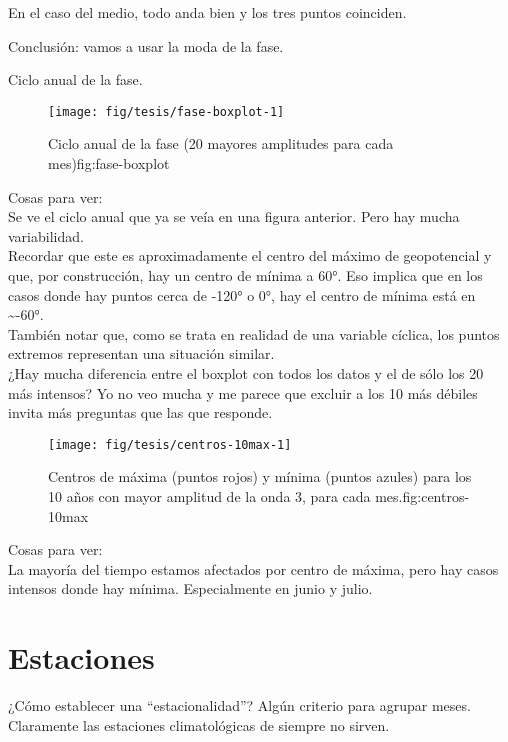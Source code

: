 \documentclass[spanish,a4paper]{book}
\begin{document}
En el caso del medio, todo anda bien y los tres puntos coinciden.

Conclusión: vamos a usar la moda de la fase.

Ciclo anual de la fase.

\begin{figure}
\texttt{[image: fig/tesis/fase-boxplot-1]} \caption{Ciclo anual de la fase (20 mayores amplitudes para cada mes){fig:fase-boxplot}}\label{fig:fase-boxplot}
\end{figure}

Cosas para ver:\\
Se ve el ciclo anual que ya se veía en una figura anterior. Pero hay
mucha variabilidad.\\
Recordar que este es aproximadamente el centro del máximo de
geopotencial y que, por construcción, hay un centro de mínima a 60°. Eso
implica que en los casos donde hay puntos cerca de -120° o 0°, hay el
centro de mínima está en \textasciitilde{}-60°.\\
También notar que, como se trata en realidad de una variable cíclica,
los puntos extremos representan una situación similar.\\
¿Hay mucha diferencia entre el boxplot con todos los datos y el de sólo
los 20 más intensos? Yo no veo mucha y me parece que excluir a los 10
más débiles invita más preguntas que las que responde.

\begin{figure}

{\centering \texttt{[image: fig/tesis/centros-10max-1]} 

}

\caption{Centros de máxima (puntos rojos) y mínima (puntos azules) para los 10 años con mayor amplitud de la onda 3, para cada mes.{fig:centros-10max}}\label{fig:centros-10max}
\end{figure}

Cosas para ver:\\
La mayoría del tiempo estamos afectados por centro de máxima, pero hay
casos intensos donde hay mínima. Especialmente en junio y julio.

\section{Estaciones}\label{estaciones}

¿Cómo establecer una ``estacionalidad''? Algún criterio para agrupar
meses. Claramente las estaciones climatológicas de siempre no sirven.
\end{document}
